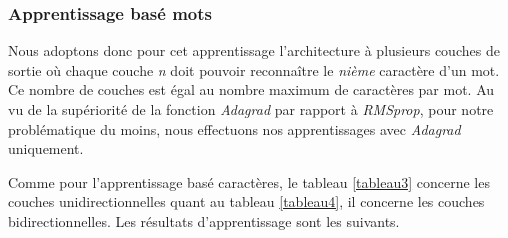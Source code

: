 \subsubsection{Apprentissage basé mots}
Nous adoptons donc pour cet apprentissage l'architecture à plusieurs couches de sortie où chaque couche \textit{n} doit pouvoir reconnaître le \textit{nième} caractère d'un mot. Ce nombre de couches est égal au nombre maximum de caractères par mot. Au vu de la supériorité de la fonction \textit{Adagrad} par rapport à \textit{RMSprop}, pour notre problématique du moins, nous effectuons nos apprentissages avec \textit{Adagrad} uniquement. 

Comme pour l'apprentissage basé caractères, le tableau \ref{tableau3} concerne les couches unidirectionnelles quant au tableau \ref{tableau4}, il concerne les couches bidirectionnelles. Les résultats d'apprentissage sont les suivants.

